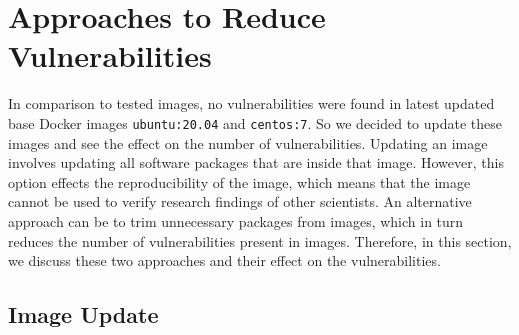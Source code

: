 %
%
\section{Approaches to Reduce Vulnerabilities}

In comparison to tested images, no vulnerabilities were found in latest
updated base
Docker images \texttt{ubuntu:20.04} and \texttt{centos:7}.
So we decided to update these images and see the effect on the
number of vulnerabilities.
Updating an image involves updating all software packages that are
inside that image. However, this option effects the reproducibility
of the image, which means that the image cannot be used to verify research
findings of other scientists. An alternative approach can be to trim unnecessary
packages from images, which in turn reduces the number of vulnerabilities
present in images. Therefore, in this section, we discuss these two
approaches and their effect on the vulnerabilities.

\subsection{Image Update}

